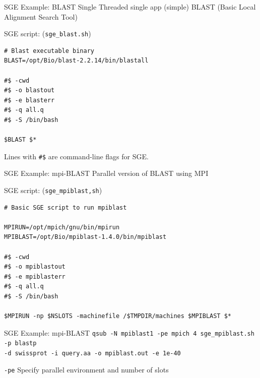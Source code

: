 \documentclass[pdf,contemporain,slideColor,nocolorBG,accumulate,nototal]{prosper}
\begin{document}
\begin{slide}{SGE Example: BLAST}
Single Threaded single app (simple) BLAST (Basic Local Alignment Search Tool)

SGE script: ({\tt sge\_blast.sh})
\tiny
\begin{verbatim}
# Blast executable binary
BLAST=/opt/Bio/blast-2.2.14/bin/blastall

#$ -cwd
#$ -o blastout
#$ -e blasterr
#$ -q all.q
#$ -S /bin/bash

$BLAST $*
\end{verbatim}
Lines with {\tt \#\$} are command-line flags for SGE.
\end{slide}


\begin{slide}{SGE Example: mpi-BLAST}
Parallel version of BLAST using MPI

SGE script: ({\tt sge\_mpiblast,sh})
\tiny
\begin{verbatim}
# Basic SGE script to run mpiblast

MPIRUN=/opt/mpich/gnu/bin/mpirun
MPIBLAST=/opt/Bio/mpiblast-1.4.0/bin/mpiblast

#$ -cwd
#$ -o mpiblastout
#$ -e mpiblasterr
#$ -q all.q
#$ -S /bin/bash

$MPIRUN -np $NSLOTS -machinefile /$TMPDIR/machines $MPIBLAST $*
\end{verbatim}
\end{slide}

\begin{slide}{SGE Example: mpi-BLAST}
{\tiny \tt qsub -N mpiblast1 -pe mpich 4 sge\_mpiblast.sh -p blastp \\}
{\tiny \tt    -d swissprot -i query.aa -o mpiblast.out -e 1e-40}
\begin{itemstep}
	\item {\tt -pe} Specify parallel environment and number of slots
\end{itemstep}
\end{slide}
\end{document}
